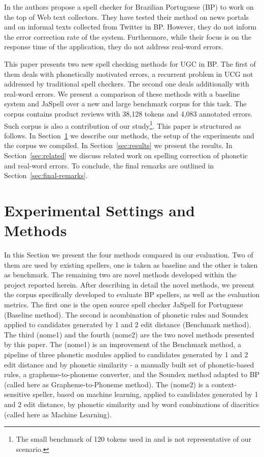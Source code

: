 In \cite{Andrade2012} the authors propose a spell checker for Brazilian Portuguese (BP) to work on the top of Web text collectors. They have tested their method on news portals and on informal texts collected from Twitter in BP. However, they do not inform the error correction rate of the system. Furthermore, while their focus is on the response time of the application, they do not address real-word errors.

This paper presents two new spell checking methods for UGC in BP. The first of them deals with phonetically motivated errors, a recurrent problem in UCG not addressed by traditional spell checkers. The second one deals additionally with real-word errors.
We present a comparison of these methods with a baseline system and JaSpell over a new and large benchmark corpus for this task. The corpus contains product reviews with 38,128 tokens and 4,083 annotated errors. Such corpus is also a contribution of our study\footnote{The small benchmark of 120 tokens used in \cite{Martins2004} and \cite{Ahmed2009} 
is not representative of our scenario.}. 
This paper is structured as follows. In Section~\ref{sec:method} we describe our methods, the setup of the experiments and the corpus we compiled. In Section~\ref{sec:results} we present the results. In Section~\ref{sec:related} we discuss related work on spelling correction of phonetic and real-word errors. To conclude, the final remarks are outlined in Section~\ref{sec:final-remarks}.

\section{Experimental Settings and Methods}\label{sec:method}

In this Section we present the four methods compared in our evaluation. Two of them are used by existing spellers, one is taken as baseline and the other is taken as benchmark. The remaining two are novel methods developed within the project reported herein. After describing in detail the novel methods, we present the corpus specifically developed to evaluate BP spellers, as well as the evaluation metrics.
The first one is the open source spell checker JaSpell for Portuguese (Baseline method). The second is acombination of phonetic rules and Soundex applied to candidates generated by 1 and 2 edit distance (Benchmark method). The third (nome1) and the fourth (nome2) are the two novel methods presented by this paper. The (nome1) is an improvement of the Benchmark method, a pipeline of three phonetic modules applied to candidates generated by 1 and 2 edit distance and by phonetic similarity - a manually built set of phonetic-based rules, a grapheme-to-phoneme converter, and the Soundex method adapted to BP (called here as Grapheme-to-Phoneme method). The (nome2) is a context-sensitive speller, based on machine learning, applied to candidates generated by 1 and 2 edit distance, by phonetic similarity and by word combinations of diacritics (called here as Machine Learning).
 

